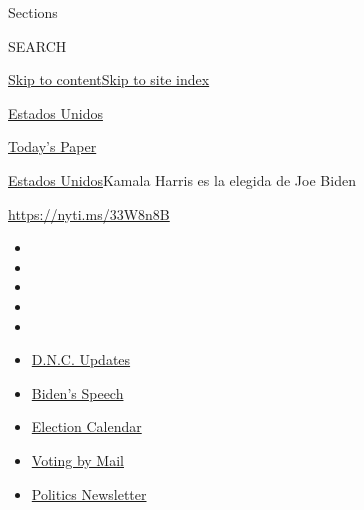 Sections

SEARCH

\protect\hyperlink{site-content}{Skip to
content}\protect\hyperlink{site-index}{Skip to site index}

\href{https://www.nytimes3xbfgragh.onion/es/section/estados-unidos}{Estados
Unidos}

\href{https://myaccount.nytimes3xbfgragh.onion/auth/login?response_type=cookie\&client_id=vi}{}

\href{https://www.nytimes3xbfgragh.onion/section/todayspaper}{Today's
Paper}

\href{/es/section/estados-unidos}{Estados Unidos}\textbar{}Kamala Harris
es la elegida de Joe Biden

\url{https://nyti.ms/33W8n8B}

\begin{itemize}
\item
\item
\item
\item
\item
\end{itemize}

\begin{itemize}
\item
  \href{https://www.nytimes3xbfgragh.onion/live/2020/08/20/us/dnc-convention-election?action=click\&pgtype=Article\&state=default\&region=TOP_BANNER\&context=storylines_menu}{D.N.C.
  Updates}
\item
  \href{https://www.nytimes3xbfgragh.onion/2020/08/20/us/politics/biden-presidential-nomination-dnc.html?action=click\&pgtype=Article\&state=default\&region=TOP_BANNER\&context=storylines_menu}{Biden's
  Speech}
\item
  \href{https://www.nytimes3xbfgragh.onion/interactive/2019/us/elections/2020-presidential-election-calendar.html?action=click\&pgtype=Article\&state=default\&region=TOP_BANNER\&context=storylines_menu}{Election
  Calendar}
\item
  \href{https://www.nytimes3xbfgragh.onion/interactive/2020/08/11/us/politics/vote-by-mail-us-states.html?action=click\&pgtype=Article\&state=default\&region=TOP_BANNER\&context=storylines_menu}{Voting
  by Mail}
\item
  \href{https://www.nytimes3xbfgragh.onion/newsletters/politics?action=click\&pgtype=Article\&state=default\&region=TOP_BANNER\&context=storylines_menu}{Politics
  Newsletter}
\end{itemize}

